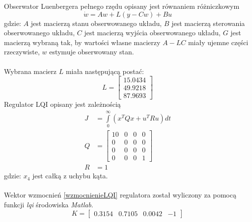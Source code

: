 Obserwator Luenbergera pełnego rzędu opisany jest równaniem różniczkowym
\begin{equation}
\dot w = Aw+L(y-Cw)+Bu
\end{equation}
\noindent gdzie:\newline
\(A\) jest macierzą stanu obserwowanego układu,\newline
\(B\) jest macierzą sterowania obserwowanego układu,\newline
\(C\) jest macierzą wyjścia obserwowanego układu,\newline
\(G\) jest macierzą wybraną tak, by wartości własne macierzy \(A-LC\) miały ujemne części rzeczywiste,\newline
\(w\) estymuje obserwowany stan.
\paragraph*{}
Wybrana macierz \(L\) miała następującą postać:
\begin{equation}
L =
\begin{bmatrix}
15.0434\\
49.9218\\
87.9693
\end{bmatrix}
\end{equation}
%
Regulator LQI opisany jest zależnością 
\begin{equation}
\begin{aligned}
J&=\int\limits_0^{\infty}(x^TQx+u^TRu)dt\\
Q&=\begin{bmatrix}
10 & 0 & 0 & 0\\
0 & 0 & 0 & 0\\
0 & 0 & 0 & 0\\
0 & 0 & 0 & 1
\end{bmatrix}\\
R&=1
\end{aligned}
\end{equation}
\noindent gdzie:\newline
\(x_4\) jest całką z uchybu kąta.\\\\
%
Wektor wzmocnień \ref{wzmocnienieLQI} regulatora został wyliczony za pomocą funkcji \textit{lqi} środowiska \textit{Matlab}.
\begin{equation}
K=\begin{bmatrix}
0.3154 & 0.7105 & 0.0042 & -1
\end{bmatrix}
\label{wzmocnienieLQI}
\end{equation}

